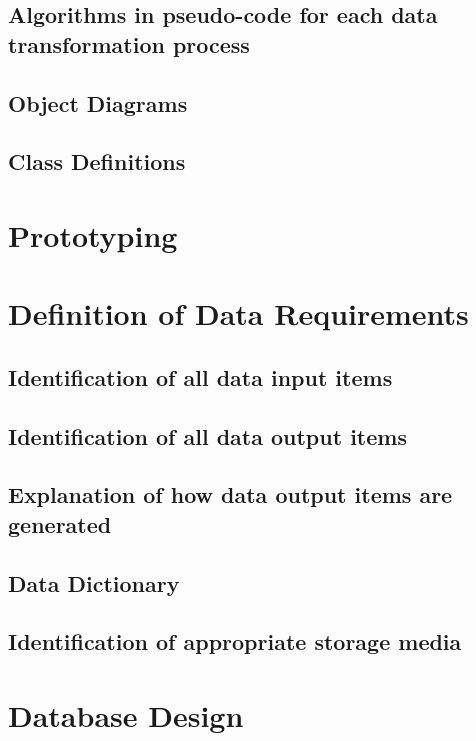 \subsection{Algorithms in pseudo-code for each data transformation process}

\subsection{Object Diagrams}

\subsection{Class Definitions}

\section{Prototyping}

\section{Definition of Data Requirements}

\subsection{Identification of all data input items}

\subsection{Identification of all data output items}

\subsection{Explanation of how data output items are generated}

\subsection{Data Dictionary}

\subsection{Identification of appropriate storage media}

\section{Database Design}

